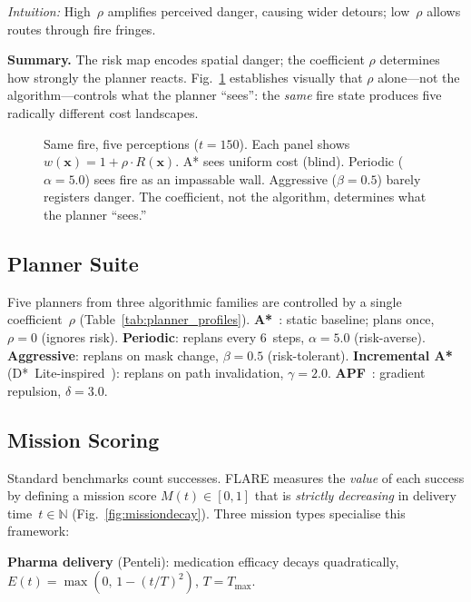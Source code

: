 \documentclass[conference]{IEEEtran}
\begin{document}
\emph{Intuition:} High~$\rho$ amplifies perceived danger, causing wider
detours; low~$\rho$ allows routes through fire fringes.

\textbf{Summary.} The risk map encodes spatial danger; the coefficient
$\rho$ determines how strongly the planner reacts.
Fig.~\ref{fig:riskperception} establishes visually that $\rho$ alone---not
the algorithm---controls what the planner ``sees'': the \emph{same}
fire state produces five radically different cost landscapes.

\begin{figure}[!t]
  \centering
  \caption{Same fire, five perceptions ($t{=}150$). Each panel shows
    $w(\mathbf{x}) = 1 + \rho \cdot R(\mathbf{x})$. A* sees uniform cost
    (blind). Periodic ($\alpha{=}5.0$) sees fire as an impassable wall.
    Aggressive ($\beta{=}0.5$) barely registers danger. The coefficient,
    not the algorithm, determines what the planner ``sees.''}
  \label{fig:riskperception}
\end{figure}

\subsection{Planner Suite}\label{sec:planners}

Five planners from three algorithmic families are controlled by a single
coefficient~$\rho$ (Table~\ref{tab:planner_profiles}).
\textbf{A*}~\cite{Hart1968}: static baseline; plans once, $\rho{=}0$
(ignores risk).
\textbf{Periodic}: replans every 6~steps, $\alpha{=}5.0$ (risk-averse).
\textbf{Aggressive}: replans on mask change, $\beta{=}0.5$
(risk-tolerant).
\textbf{Incremental A*} (D*~Lite-inspired~\cite{Koenig2002}): replans on
path invalidation, $\gamma{=}2.0$.
\textbf{APF}~\cite{Khatib1986}: gradient repulsion, $\delta{=}3.0$.



\subsection{Mission Scoring}\label{sec:missions}

Standard benchmarks count successes. FLARE measures the \emph{value} of
each success by defining a mission score $M(t) \in [0,1]$ that is
\emph{strictly decreasing} in delivery time~$t \in \mathbb{N}$
(Fig.~\ref{fig:missiondecay}). Three mission types specialise this
framework:

\textbf{Pharma delivery} (Penteli): medication efficacy decays
quadratically, $E(t) = \max(0,\, 1 - (t/T)^2)$, $T{=}T_{\max}$.
\end{document}
